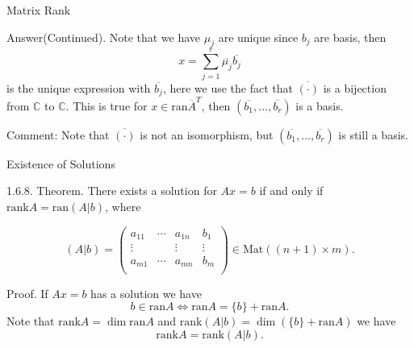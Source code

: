 \documentclass[hyperref={pdfpagelabels=true}]{beamer}
\newcommand{\C}{\mathbb{C}} \newcommand{\F}{\mathbb{F}} \newcommand{\R}{\mathbb{R}} \newcommand{\Q}{\mathbb{Q}}
\newcommand{\Mat}{\text{Mat}}
\newcommand{\<}{\langle}
\renewcommand{\>}{\rangle}
\begin{document}
    \begin{frame}{Matrix Rank}
        \begin{block}{Answer(Continued).}
            Note that we have $\mu_{j}$ are unique since $b_{j}$ are basis, then 
            \[x = \sum_{j = 1}^{r}\overline{\mu_{j}}\overline{b_{j}}\]
            is the unique expression with $\overline{b_{j}}$, here we use the fact that $\overline{(\cdot)}$ is a bijection from $\C$ to $\C$. This is true for $x \in \text{ran}\overline{A}^{T}$, then $(\overline{b_{1}},...,\overline{b_{r}})$ is a basis.
        \end{block}
        \begin{block}{Comment:}
            Note that $\overline{(\cdot)}$ is not an isomorphism, but $(\overline{b_{1}},...,\overline{b_{r}})$ is still a basis. 
        \end{block}
    \end{frame}
    \begin{frame}{Existence of Solutions}
        \begin{block}{1.6.8. Theorem.}
            There exists a solution for $Ax = b$ if and only if $\text{rank}A = \text{ran}(A|b)$, where
            \begin{spacing}{0.5}
            \[
                (A|b) = 
                \begin{pmatrix}
                    a_{11} & \cdots & a_{1n} & b_{1} \\
                    \vdots & & \vdots & \vdots\\
                    a_{m1} & \cdots & a_{mn} & b_{m}\\
                \end{pmatrix}
                \in \Mat((n+1) \times m).
            \]
            \end{spacing}
            \end{block}
            \begin{block}{Proof.}
                If $Ax = b$ has a solution we have
                \[b \in \text{ran}A \Leftrightarrow \text{ran}A = \{b\}+\text{ran}A.\]
                Note that $\text{rank}A = \dim \text{ran}A$ and $\text{rank}(A|b) = \dim \left(\{b\}+\text{ran}A\right)$ we have
                \[\text{rank}A = \text{rank}(A|b).\]
            \end{block}
        \end{frame}
\end{document}
